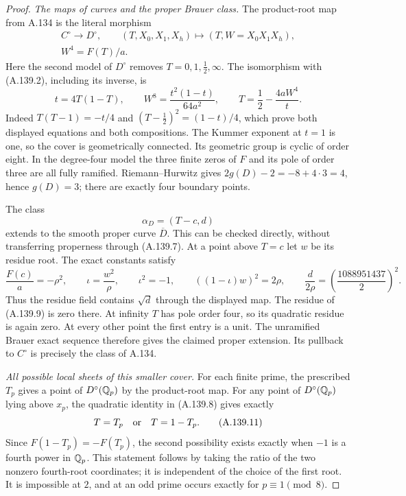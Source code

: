 \begin{proof}
\emph{The maps of curves and the proper Brauer class.}
The product-root map from A.134 is the literal morphism
\[
 \begin{gathered}
 C^\circ\longrightarrow D^\circ,\qquad
       (T,X_0,X_1,X_h)\longmapsto(T,W=X_0X_1X_h),\\
                         W^4=F(T)/a .
 \end{gathered}
\tag{A.139.7}
\]
Here the second model of \(D^\circ\) removes
\(T=0,1,\tfrac12,\infty\).
The isomorphism with (A.139.2), including its inverse, is
\[
     t=4T(1-T),\qquad
     W^8=\frac{t^2(1-t)}{64a^2},\qquad
     T=\frac12-\frac{4aW^4}{t}.
\tag{A.139.8}
\]
Indeed \(T(T-1)=-t/4\) and
\((T-\tfrac12)^2=(1-t)/4\), which prove both displayed
equations and both compositions.
The Kummer exponent at \(t=1\) is one, so the cover is geometrically
connected.  Its geometric group is cyclic of order eight.
In the degree-four model the three finite zeros of \(F\) and its
pole of order three are all fully ramified.  Riemann--Hurwitz gives
\(2g(D)-2=-8+4\cdot3=4\), hence \(g(D)=3\);
there are exactly four boundary points.

The class
\[
                        \alpha_D=(T-c,d)
\tag{A.139.9}
\]
extends to the smooth proper curve \(\overline D\).
This can be checked directly, without transferring properness
through (A.139.7).
At a point above \(T=c\) let \(w\) be its residue root.
The exact constants satisfy
\[
 \frac{F(c)}a=-\rho^2,\qquad
 \iota=\frac{w^2}{\rho},\qquad \iota^2=-1,\qquad
       ((1-\iota)w)^2=2\rho,\qquad
 \frac{d}{2\rho}=\left(\frac{1088951437}{2}\right)^2 .
\tag{A.139.10}
\]
Thus the residue field contains \(\sqrt d\) through the
displayed map.  The residue of (A.139.9) is zero there.
At infinity \(T\) has pole order four, so its quadratic residue
is again zero.  At every other point the first entry is a unit.
The unramified Brauer exact sequence therefore gives the claimed
proper extension.  Its pullback to \(C^\circ\) is precisely the
class of A.134.

\emph{All possible local sheets of this smaller cover.}
For each finite prime, the prescribed \(T_p\) gives a point of
\(D^\circ(\mathbb Q_p)\) by the product-root map.
For any point of \(D^\circ(\mathbb Q_p)\) lying above \(x_p\), the quadratic
identity in (A.139.8) gives exactly
\[
                              T=T_p\quad\hbox{or}\quad T=1-T_p.
\tag{A.139.11}
\]
Since \(F(1-T_p)=-F(T_p)\), the second possibility exists exactly
when \(-1\) is a fourth power in \(\mathbb Q_p\).  This statement follows
by taking the ratio of the two nonzero fourth-root coordinates;
it is independent of the choice of the first root.
It is impossible at \(2\), and at an odd prime occurs exactly for
\(p\equiv1\pmod8\).


\end{proof}
